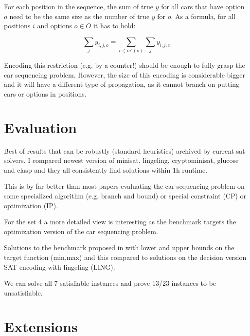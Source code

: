 \documentclass[]{llncs}
\newcommand{\TODO}[1]{ {\color{red}{#1} }}
\begin{document}
For each position in the sequence, the
sum of true $y$ for all cars that have option $o$ need to be the same
size as the number of true $y$ for $o$. As a formula, for all positions
$i$ and options $ o \in O$ it has to hold: 

$$ \sum_{j} y_{i,j,o} = \sum_{c \in m'(o)} \sum_j y_{i,j,c} $$

Encoding this restriction (e.g. by a counter!) should be enough to fully
grasp the car sequencing problem. However, the size of this encoding
is considerable bigger  and it will have a different type of propagation, as
it cannot branch on putting cars or options in positions. 


\section{Evaluation}

Best of results that can be robustly (standard heuristics) archived by
current sat solvers. I compared newest version of minisat, lingeling,
cryptominisat, glucose and clasp and they all consistently find
solutions within 1h runtime. 

\DTLsetseparator{,}

\begin{table}[htbp]
    \caption{}
    \centering
\end{table}


This is by far better than most papers evaluating the car sequencing
problem on some specialized algorithm (e.g. branch and bound) or special
constraint (CP) or optimization (IP). 

For the set 4 a more detailed view is interesting as the benchmark
targets the optimization version of the car sequencing problem. 

\DTLsetseparator{,}

\begin{table}[htbp]
    \caption{Solutions to the benchmark proposed in \TODO{ref} with
    lower and upper bounds on the target function (min,max) and this
compared to solutions on the decision version  SAT encoding with lingeling (LING). }
    \centering
\end{table}


We can solve all 7 satisfiable instances and prove 13/23 instances to be
unsatisfiable. 


\section{Extensions}
\end{document}

